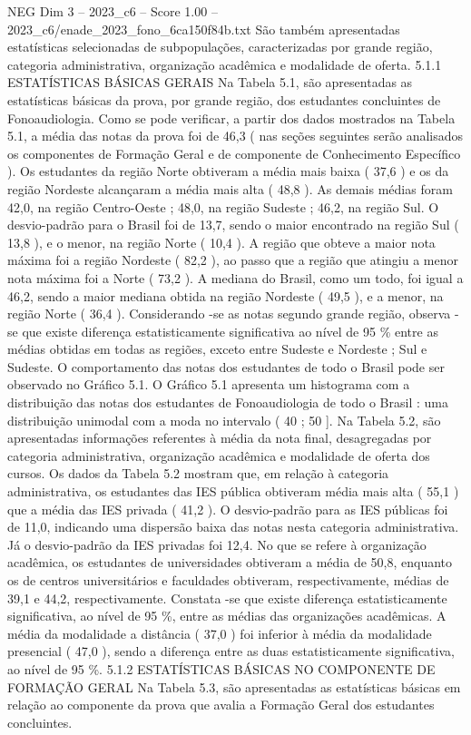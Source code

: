 \begin{textsample}{NEG Dim 3 – 2023\_c6 – Score 1.00 – 2023\_c6/enade\_2023\_fono\_6ca150f84b.txt}
São também apresentadas estatísticas selecionadas de subpopulações, caracterizadas por grande região, categoria administrativa, organização acadêmica e modalidade de oferta. 5.1.1 ESTATÍSTICAS BÁSICAS GERAIS Na Tabela 5.1, são apresentadas as estatísticas básicas da prova, por grande região, dos estudantes concluintes de Fonoaudiologia.
Como se pode verificar, a partir dos dados mostrados na Tabela 5.1, a média das notas da prova foi de 46,3 ( nas seções seguintes serão analisados os componentes de Formação Geral e de componente de Conhecimento Específico ).
Os estudantes da região Norte obtiveram a média mais baixa ( 37,6 ) e os da região Nordeste alcançaram a média mais alta ( 48,8 ).
As demais médias foram 42,0, na região Centro-Oeste ; 48,0, na região Sudeste ; 46,2, na região Sul.
O desvio-padrão para o Brasil foi de 13,7, sendo o maior encontrado na região Sul ( 13,8 ), e o menor, na região Norte ( 10,4 ).
A região que obteve a maior nota máxima foi a região Nordeste ( 82,2 ), ao passo que a região que atingiu a menor nota máxima foi a Norte ( 73,2 ).
A mediana do Brasil, como um todo, foi igual a 46,2, sendo a maior mediana obtida na região Nordeste ( 49,5 ), e a menor, na região Norte ( 36,4 ).
Considerando -se as notas segundo grande região, observa -se que existe diferença estatisticamente significativa ao nível de 95 \% entre as médias obtidas em todas as regiões, exceto entre Sudeste e Nordeste ; Sul e Sudeste.
O comportamento das notas dos estudantes de todo o Brasil pode ser observado no Gráfico 5.1.
O Gráfico 5.1 apresenta um histograma com a distribuição das notas dos estudantes de Fonoaudiologia de todo o Brasil : uma distribuição unimodal com a moda no intervalo ( 40 ; 50 ].
Na Tabela 5.2, são apresentadas informações referentes à média da nota final, desagregadas por categoria administrativa, organização acadêmica e modalidade de oferta dos cursos.
Os dados da Tabela 5.2 mostram que, em relação à categoria administrativa, os estudantes das IES pública obtiveram média mais alta ( 55,1 ) que a média das IES privada ( 41,2 ).
O desvio-padrão para as IES públicas foi de 11,0, indicando uma dispersão baixa das notas nesta categoria administrativa.
Já o desvio-padrão da IES privadas foi 12,4.
No que se refere à organização acadêmica, os estudantes de universidades obtiveram a média de 50,8, enquanto os de centros universitários e faculdades obtiveram, respectivamente, médias de 39,1 e 44,2, respectivamente.
Constata -se que existe diferença estatisticamente significativa, ao nível de 95 \%, entre as médias das organizações acadêmicas.
A média da modalidade a distância ( 37,0 ) foi inferior à média da modalidade presencial ( 47,0 ), sendo a diferença entre as duas estatisticamente significativa, ao nível de 95 \%. 5.1.2 ESTATÍSTICAS BÁSICAS NO COMPONENTE DE FORMAÇÃO GERAL Na Tabela 5.3, são apresentadas as estatísticas básicas em relação ao componente da prova que avalia a Formação Geral dos estudantes concluintes.

\end{textsample}
